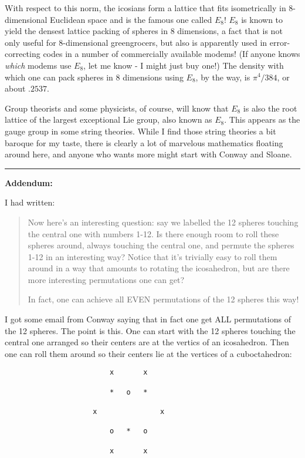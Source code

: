 \documentclass{article}
\begin{document}
With respect to this norm, the icosians form a lattice that fits
isometrically in 8-dimensional Euclidean space and is the famous one
called \(E_8\)! \(E_8\) is known to yield the densest lattice packing of
spheres in 8 dimensions, a fact that is not only useful for
8-dimensional greengrocers, but also is apparently used in
error-correcting codes in a number of commercially available modems! (If
anyone knows \emph{which} modems use \(E_8\), let me know - I might just
buy one!) The density with which one can pack spheres in 8 dimensions
using \(E_8\), by the way, is \(\pi^4/384\), or about \(.2537\).

Group theorists and some physicists, of course, will know that \(E_8\)
is also the root lattice of the largest exceptional Lie group, also
known as \(E_8\). This appears as the gauge group in some string
theories. While I find those string theories a bit baroque for my taste,
there is clearly a lot of marvelous mathematics floating around here,
and anyone who wants more might start with Conway and Sloane.

\begin{center}\rule{0.5\linewidth}{0.5pt}\end{center}

\textbf{Addendum:}

I had written:

\begin{quote}
Now here's an interesting question: say we labelled the 12 spheres
touching the central one with numbers 1-12. Is there enough room to roll
these spheres around, always touching the central one, and permute the
spheres 1-12 in an interesting way? Notice that it's trivially easy to
roll them around in a way that amounts to rotating the icosahedron, but
are there more interesting permutations one can get?

In fact, one can achieve all EVEN permutations of the 12 spheres this
way!
\end{quote}

I got some email from Conway saying that in fact one get ALL
permutations of the 12 spheres. The point is this. One can start with
the 12 spheres touching the central one arranged so their centers are at
the vertics of an icosahedron. Then one can roll them around so their
centers lie at the vertices of a cuboctahedron:

\begin{verbatim}
                         x       x   

                         *   o   * 
 
                     x               x

                         o   *   o

                         x       x
\end{verbatim}
\end{document}
